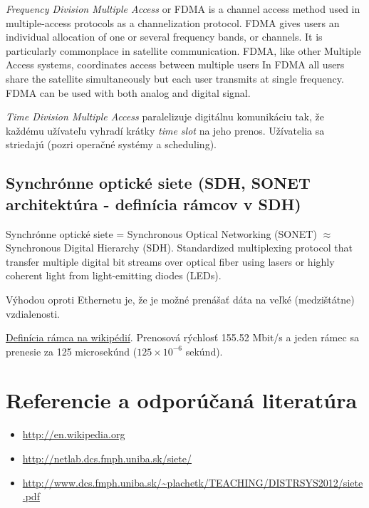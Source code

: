 \documentclass[10pt,a4paper]{article}
\begin{document}
\emph{Frequency Division Multiple Access} or FDMA is a channel access method used in multiple-access protocols as a channelization protocol. FDMA gives users an individual allocation of one or several frequency bands, or channels. It is particularly commonplace in satellite communication. FDMA, like other Multiple Access systems, coordinates access between multiple users
In FDMA all users share the satellite simultaneously but each user transmits at single frequency.
FDMA can be used with both analog and digital signal.
              
\emph{Time Division Multiple Access} paralelizuje digitálnu komunikáciu tak, že každému užívateľu vyhradí krátky \emph{time slot} na jeho prenos. Užívatelia sa striedajú (pozri operačné systémy a scheduling). 
                         
\subsection{Synchrónne optické siete (SDH, SONET architektúra - definícia rámcov v SDH)}
Synchrónne optické siete = Synchronous Optical Networking (SONET) $\approx$ Synchronous Digital Hierarchy (SDH). 
Standardized multiplexing protocol that transfer multiple digital bit streams over optical fiber using lasers or highly coherent light from light-emitting diodes (LEDs).

Výhodou oproti Ethernetu je, že je možné prenášať dáta na veľké (medzištátne) vzdialenosti. 

\href{http://en.wikipedia.org/wiki/Synchronous\_optical\_networking\#SDH_frame}{Definícia rámca na wikipédií}.
Prenosová rýchlosť 155.52 Mbit/s a jeden rámec sa prenesie za 125 microsekúnd ($125 \times 10^{-6}$ sekúnd).


\section{Referencie a odporúčaná literatúra}
\begin{itemize}                                
\item \url{http://en.wikipedia.org} 
\item \url{http://netlab.dcs.fmph.uniba.sk/siete/} 
\item \url{http://www.dcs.fmph.uniba.sk/\~plachetk/TEACHING/DISTRSYS2012/siete.pdf} 
\end{itemize}
\end{document}
